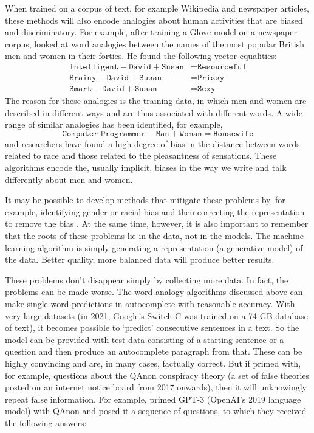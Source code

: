 When trained on a corpus of text, for example Wikipedia and newspaper articles, these methods will also encode analogies about human activities that are biased and discriminatory.  For example, after training a Glove model on a newspaper corpus,  \textcite{sumpter2018outnumbered} looked at word analogies between the names of the most popular British men and women in their forties. He found the following vector equalities:
\begin{align*}
\texttt{Intelligent} - \texttt{David} + \texttt{Susan} & = \texttt{Resourceful} \\
\texttt{Brainy} - \texttt{David} + \texttt{Susan} & = \texttt{Prissy}\\
\texttt{Smart} - \texttt{David} + \texttt{Susan} & =  \texttt{Sexy}
\end{align*}
The reason for these analogies is the training data, in which men and women are described in different ways and are thus associated with different words. A wide range of similar analogies has been identified, for example,
\[
\texttt{Computer Programmer} - \texttt{Man} + \texttt{Woman} = \texttt{Housewife}
\]
and researchers have found a high degree of bias in the distance between words related to race and those related to the pleasantness  of sensations. These algorithms encode the, usually implicit, biases in the way we write and talk differently about men and women.

It may be possible to develop methods that mitigate these problems by, for example, identifying gender or racial bias and then correcting the representation to remove the bias \parencite{bolukbasi2016man}. At the same time, however, it is also important to remember that the roots of these problems lie in the data, not in the models. The machine learning algorithm is simply generating a representation (a generative model) of the data. Better quality, more balanced data will produce better results.

These problems don't disappear simply by collecting more data. In fact, the problems can be made worse. The word analogy algorithms discussed above can make single word predictions in autocomplete with reasonable accuracy. With very large datasets (in 2021, Google's Switch-C was trained on a 74 GB database of text), it becomes possible to `predict' consecutive sentences in a text. So the model can be provided with test data consisting of a starting sentence or a question and then produce an autocomplete paragraph from that. These can be highly convincing and are, in many cases, factually correct. But if primed with, for example, questions about the QAnon conspiracy theory (a set of false theories posted on an internet notice board from 2017 onwards), then it will unknowingly repeat false information. For example, \textcite{mcguffie2020radicalization} primed GPT-3 (OpenAI's 2019 language model) with QAnon and posed it a sequence of questions, to which they received the following answers:

